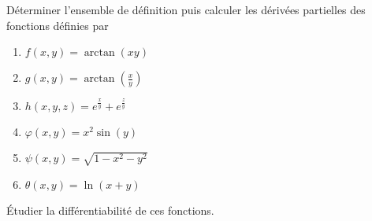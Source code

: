 \begin{exercice}\label{exoCalculDifferentiel0002}

Déterminer l'ensemble de définition puis calculer les dérivées partielles des fonctions définies par 
\begin{multicols}{2}
	\begin{enumerate}
		\item
$f(x,y) = \arctan(xy)$
\item
	$g(x,y) = \arctan\left( \frac{ x }{ y } \right)$
\item
$h(x,y,z) = e^{ \frac{x}{y}} +  e^{ \frac{z}{y}}$
\item
$\varphi (x,y)=x^2\sin(y)$
\item
$\psi(x,y) = \sqrt{1-x^2-y^2}$
\item
$\theta (x,y) = \ln(x+y)$
	\end{enumerate}
\end{multicols}
Étudier la différentiabilité de ces fonctions.


\end{exercice}
